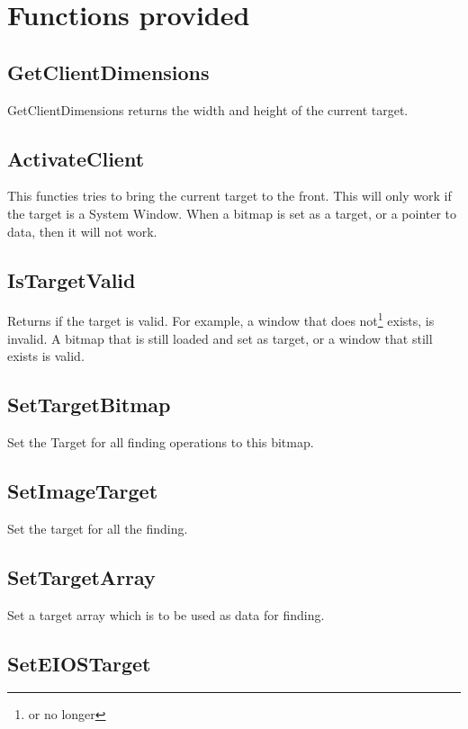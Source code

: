 \documentclass[a4paper]{report}
\begin{document}
\section{Functions provided}

\subsection{GetClientDimensions}

GetClientDimensions returns the width and height of the current target.

\subsection{ActivateClient}

This functies tries to bring the current target to the front.
This will only work if the target is a System Window. When a bitmap is set as a
target, or a pointer to data, then it will not work.

\subsection{IsTargetValid}

Returns if the target is valid. For example, a window that does not\footnote{or
no longer} exists, is invalid. A bitmap that is still loaded and set as target,
or a window that still exists is valid.

\subsection{SetTargetBitmap}

Set the Target for all finding operations to this bitmap.

\subsection{SetImageTarget}

Set the target for all the finding.

\subsection{SetTargetArray}

Set a target array which is to be used as data for finding.

\subsection{SetEIOSTarget}
\end{document}
